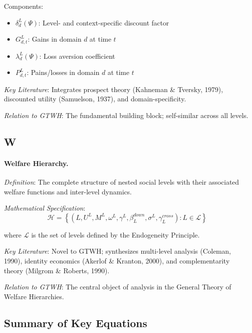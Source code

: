 \documentclass[12pt,a4paper]{article}
\begin{document}
Components:
\begin{itemize}[nosep]
\item $\delta^L_d(\Psi)$: Level- and context-specific discount factor
\item $G^L_{d,t}$: Gains in domain $d$ at time $t$
\item $\lambda^L_d(\Psi)$: Loss aversion coefficient
\item $P^L_{d,t}$: Pains/losses in domain $d$ at time $t$
\end{itemize}

\textit{Key Literature}: Integrates prospect theory (Kahneman \& Tversky, 1979), 
discounted utility (Samuelson, 1937), and domain-specificity.

\textit{Relation to GTWH}: The fundamental building block; self-similar across 
all levels.

\subsection*{W}

\paragraph{Welfare Hierarchy.}
\textit{Definition}: The complete structure of nested social levels with their 
associated welfare functions and inter-level dynamics.

\textit{Mathematical Specification}:
\begin{equation}
\mathcal{H} = \left\{(L, U^L, M^L, \omega^L, \gamma^L, \beta^{down}_L, \sigma^L, \gamma^{cross}_L) : L \in \mathcal{L}\right\}
\end{equation}

where $\mathcal{L}$ is the set of levels defined by the Endogeneity Principle.

\textit{Key Literature}: Novel to GTWH; synthesizes multi-level analysis 
(Coleman, 1990), identity economics (Akerlof \& Kranton, 2000), and 
complementarity theory (Milgrom \& Roberts, 1990).

\textit{Relation to GTWH}: The central object of analysis in the General Theory 
of Welfare Hierarchies.

\subsection*{Summary of Key Equations}
\end{document}
